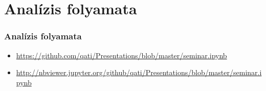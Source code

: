 \documentclass{beamer}
\begin{document}
\section{Analízis folyamata}
\begin{frame}
\frametitle{Analízis folyamata}
\begin{itemize}
  \setlength{\itemsep}{24pt}
\item \url{https://github.com/qati/Presentations/blob/master/seminar.ipynb}\newline
\item \url{http://nbviewer.jupyter.org/github/qati/Presentations/blob/master/seminar.ipynb}
\end{itemize}
\end{frame}
\end{document}
